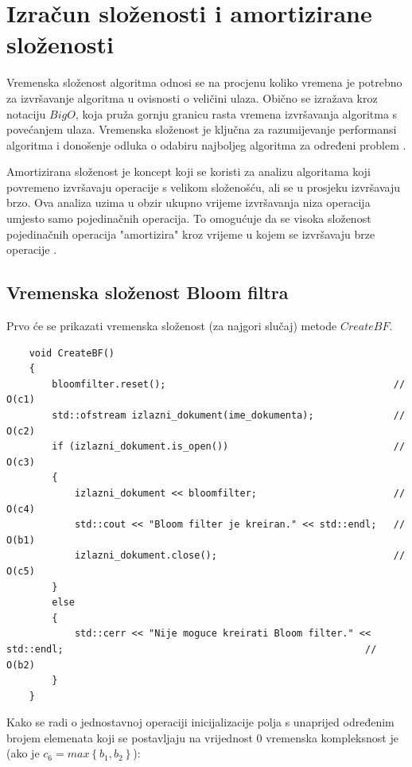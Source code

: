 \documentclass{foi}
\begin{document}
\chapter{Izračun složenosti i amortizirane složenosti}

Vremenska složenost algoritma odnosi se na procjenu koliko vremena je potrebno za izvršavanje algoritma u ovisnosti o veličini ulaza. Obično se izražava kroz notaciju $Big O$, koja pruža gornju granicu rasta vremena izvršavanja algoritma s povećanjem ulaza. Vremenska složenost je ključna za razumijevanje performansi algoritma i donošenje odluka o odabiru najboljeg algoritma za određeni problem \cite{levitin2014introduction}.

Amortizirana složenost je koncept koji se koristi za analizu algoritama koji povremeno izvršavaju operacije s velikom složenošću, ali se u prosjeku izvršavaju brzo. Ova analiza uzima u obzir ukupno vrijeme izvršavanja niza operacija umjesto samo pojedinačnih operacija. To omogućuje da se visoka složenost pojedinačnih operacija "amortizira" kroz vrijeme u kojem se izvršavaju brze operacije \cite{levitin2014introduction}.

\section{Vremenska složenost Bloom filtra}

Prvo će se prikazati vremenska složenost (za najgori slučaj) metode $CreateBF$.

\begin{lstlisting}
    void CreateBF()
    {
        bloomfilter.reset();                                        // O(c1)
        std::ofstream izlazni_dokument(ime_dokumenta);              // O(c2)
        if (izlazni_dokument.is_open())                             // O(c3)
        {
            izlazni_dokument << bloomfilter;                        // O(c4)
            std::cout << "Bloom filter je kreiran." << std::endl;   // O(b1)
            izlazni_dokument.close();                               // O(c5)
        }
        else
        {
            std::cerr << "Nije moguce kreirati Bloom filter." << std::endl;                                                     // O(b2)
        }
    }
\end{lstlisting}

Kako se radi o jednostavnoj operaciji inicijalizacije polja s unaprijed određenim brojem elemenata koji se postavljaju na vrijednost $0$ vremenska kompleksnost je (ako je $c_6=max \left\{ b_1, b_2 \right\}$):
\end{document}
